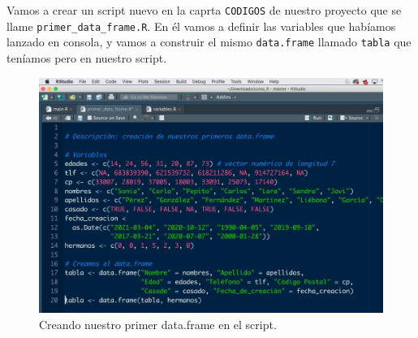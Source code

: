 \documentclass[11pt,]{book}
\begin{document}
Vamos a crear un script nuevo en la caprta \texttt{CODIGOS} de nuestro proyecto que se llame \texttt{primer\_data\_frame.R}. En él vamos a definir las variables que habíamos lanzado en consola, y vamos a construir el mismo \texttt{data.frame} llamado \texttt{tabla} que teníamos pero en nuestro script.

\begin{figure}

{\centering \includegraphics[width=0.5\linewidth]{./img/codigo_primer_data_frame} 

}

\caption{Creando nuestro primer data.frame en el script.}\label{fig:codigo-primer-data-frame}
\end{figure}
\end{document}

